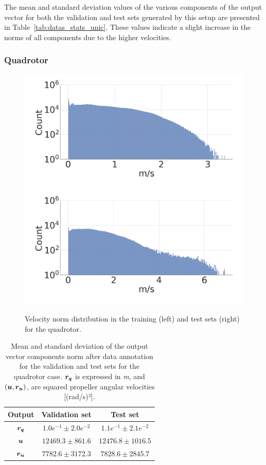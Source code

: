 The mean and standard deviation values of the various components of the output vector for both the validation and test sets generated by this setup are presented in Table~\ref{tab:datas_stats_unic}. 
These values indicate a slight increase in the norms of all components due to the higher velocities.

\subsubsection{Quadrotor}\label{sec:dataset_quad}

\begin{figure} [t]
    \centering
    \includegraphics[width=0.49\linewidth]{figures/learning_quadrotor/vnorm_val2.png}
    \includegraphics[width=0.49\linewidth]{figures/learning_quadrotor/vnorm_test.png}
    \caption{Velocity norm distribution in the training (left) and test sets (right) for the quadrotor.}%
    \label{fig: valvstest}%
\end{figure}

\begin{table}[t]
    \centering
    \begin{tabular}{ | c | c || c |}
    \hline
      \textbf{Output}  & \textbf{Validation set}  & \textbf{Test set} \\ \hline
    $\boldsymbol{r_q}$ & $1.0e^{-1} \pm 2.0e^{-2}$ & $1.1e^{-1} \pm 2.1e^{-2}$ \\ \hline
    $\boldsymbol{u}$ & $12469.3 \pm 861.6$ & $12476.8 \pm 1016.5$ \\ \hline
    $\boldsymbol{r_u}$ & $7782.6 \pm 3172.3$ & $7828.6 \pm 2845.7$ \\ \hline
\end{tabular}
\caption{
Mean and standard deviation of the output vector components norm after data annotation for the validation and test sets for the quadrotor case.
$\boldsymbol{r_q}$ is expressed in \emph{m}, and $(\boldsymbol{u}, \boldsymbol{r_u})$, are squared propeller angular velocities [(rad/s)²].}
 \label{tab:datas_stats}
\end{table}

